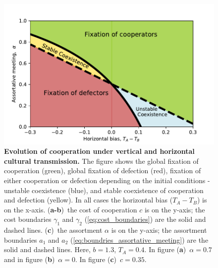 \documentclass[12pt]{extarticle}
\begin{document}
{\begin{figure}[htb]
    \includegraphics[scale=0.75]{boundiries_withAlpha_y_axis.pdf}
    \caption{\textbf{Evolution of cooperation under vertical and horizontal cultural transmission.} 
The figure shows the global fixation of cooperation (green), global fixation of defection (red), fixation of either cooperation or defection depending on the initial conditions - unstable coexistence (blue), and stable coexistence of cooperation and defection (yellow).
In all cases the horizontal bias ($T_A-T_B$) is on the x-axis.
(\textbf{a-b})~the cost of cooperation $c$ is on the y-axis; the cost boundaries $\gamma_1$ and $\gamma_2$ (\autoref{eq:cost_boundaries}) are the solid and dashed lines. 
(\textbf{c})~the assortment $\alpha$ is on the y-axis; the assortment boundaries $a_1$ and $a_2$ (\autoref{eq:boundries_assortative_meeting}) are the solid and dashed lines.
Here, $b=1.3$, $T_A=0.4$. In figure (\textbf{a})~$\alpha = 0.7$ and in figure (\textbf{b})~$\alpha = 0$. In figure (\textbf{c})~$c = 0.35$.
  	}
    \label{fig:results2}
\end{figure}

}
\end{document}
